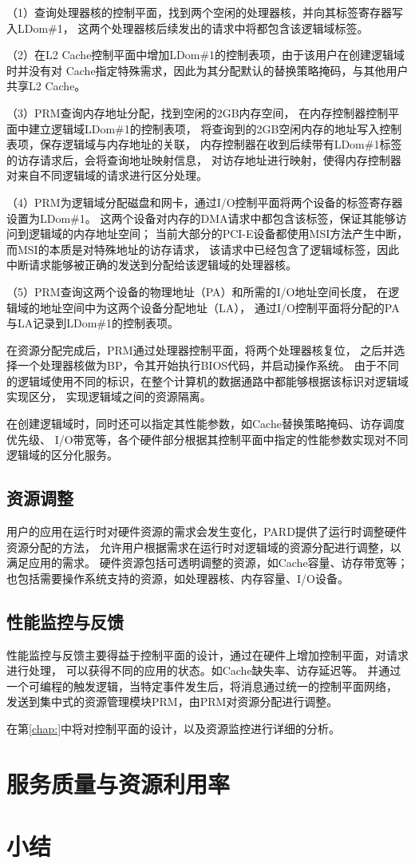 （1）查询处理器核的控制平面，找到两个空闲的处理器核，并向其标签寄存器写入LDom\#1，
这两个处理器核后续发出的请求中将都包含该逻辑域标签。

（2）在L2 Cache控制平面中增加LDom\#1的控制表项，由于该用户在创建逻辑域时并没有对
Cache指定特殊需求，因此为其分配默认的替换策略掩码，与其他用户共享L2 Cache。

（3）PRM查询内存地址分配，找到空闲的2GB内存空间，
在内存控制器控制平面中建立逻辑域LDom\#1的控制表项，
将查询到的2GB空闲内存的地址写入控制表项，保存逻辑域与内存地址的关联，
内存控制器在收到后续带有LDom\#1标签的访存请求后，会将查询地址映射信息，
对访存地址进行映射，使得内存控制器对来自不同逻辑域的请求进行区分处理。

（4）PRM为逻辑域分配磁盘和网卡，通过I/O控制平面将两个设备的标签寄存器设置为LDom\#1。
这两个设备对内存的DMA请求中都包含该标签，保证其能够访问到逻辑域的内存地址空间；
当前大部分的PCI-E设备都使用MSI方法产生中断，而MSI的本质是对特殊地址的访存请求，
该请求中已经包含了逻辑域标签，因此中断请求能够被正确的发送到分配给该逻辑域的处理器核。

（5）PRM查询这两个设备的物理地址（PA）和所需的I/O地址空间长度，
在逻辑域的地址空间中为这两个设备分配地址（LA），
通过I/O控制平面将分配的PA与LA记录到LDom\#1的控制表项。

在资源分配完成后，PRM通过处理器控制平面，将两个处理器核复位，
之后并选择一个处理器核做为BP，令其开始执行BIOS代码，并启动操作系统。
由于不同的逻辑域使用不同的标识，在整个计算机的数据通路中都能够根据该标识对逻辑域实现区分，
实现逻辑域之间的资源隔离。

在创建逻辑域时，同时还可以指定其性能参数，如Cache替换策略掩码、访存调度优先级、
I/O带宽等，各个硬件部分根据其控制平面中指定的性能参数实现对不同逻辑域的区分化服务。


\subsection{资源调整}

用户的应用在运行时对硬件资源的需求会发生变化，PARD提供了运行时调整硬件资源分配的方法，
允许用户根据需求在运行时对逻辑域的资源分配进行调整，以满足应用的需求。
硬件资源包括可透明调整的资源，如Cache容量、访存带宽等；
也包括需要操作系统支持的资源，如处理器核、内存容量、I/O设备。




\subsection{性能监控与反馈}

性能监控与反馈主要得益于控制平面的设计，通过在硬件上增加控制平面，对请求进行处理，
可以获得不同的应用的状态。如Cache缺失率、访存延迟等。
并通过一个可编程的触发逻辑，当特定事件发生后，将消息通过统一的控制平面网络，
发送到集中式的资源管理模块PRM，由PRM对资源分配进行调整。

在第\ref{chap:}中将对控制平面的设计，以及资源监控进行详细的分析。


\section{服务质量与资源利用率}


\section{小结}

